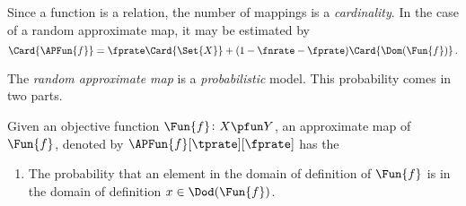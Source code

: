 \documentclass[ ../main.tex]{subfiles}
\begin{document}
Since a function is a relation, the number of mappings is a \emph{cardinality}.
In the case of a random approximate map, it may be estimated by
\begin{equation}
\Card{\APFun{f}} = \fprate \Card{\Set{X}} + (1 - \fnrate - \fprate) \Card{\Dom(\Fun{f})}\,.
\end{equation}





The \emph{random approximate map} is a \emph{probabilistic} model.
This probability comes in two parts.

Given an objective function $\Fun{f} \colon X \pfun Y$, an approximate map of $\Fun{f}$, denoted by $\APFun{f}[\tprate][\fprate]$ has the 
\begin{enumerate}
	\item The probability that an element in the domain of definition of $\Fun{f}$ is in the domain of definition $x \in \Dod(\Fun{f})$.
\end{enumerate}
\end{document}
